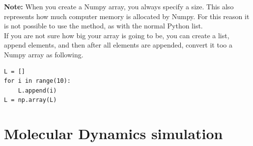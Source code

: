 \documentclass{article}
\begin{document}
{\bf Note:}
When you create a Numpy array, you always specify a size.
This also represents how much computer memory is allocated by Numpy.
For this reason it is not possible to use the  method, as with
the normal Python list.\\

If you are not sure how big your array is going to be, you can create a list, append elements,
and then after all elements are appended, convert it too a Numpy array as following.

\begin{lstlisting}
L = []
for i in range(10):
    L.append(i)
L = np.array(L)
\end{lstlisting}

%
%
%
%
%
%
%
%
%
%
%
%
%
%
%

\newpage

\section{Molecular Dynamics simulation}
\end{document}
